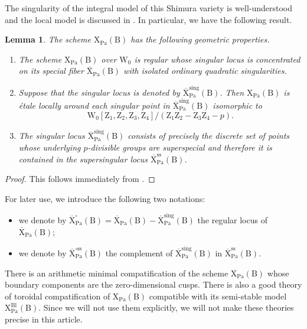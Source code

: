 \documentclass[10pt]{amsart}
\numberwithin{equation}{section}
\newtheorem{lemma}[equation]{Lemma}
\theoremstyle{definition}
\def\Pa{\mathrm{Pa}}
\def\rmB{\mathrm{B}}
\def\rmW{\mathrm{W}}
\def\rmX{\mathrm{X}}
\def\rmZ{\mathrm{Z}}
\begin{document}
The singularity of the integral model of this Shimura variety is well-understood and the local model is discussed in \cite[\S 2.3]{Wanga}. In particular, we have the following result.
\begin{lemma}
The scheme $\rmX_{\Pa}(\rmB)$ has the following geometric properties.
\begin{enumerate}
\item The scheme $\rmX_{\Pa}(\rmB)$ over $\mathrm{W}_{0}$ is regular whose singular locus is concentrated on its special fiber $\overline{\rmX}_{\Pa}(\rmB)$ with isolated ordinary quadratic singularities. 

\item Suppose that the singular locus is denoted by $\overline{\rmX}^{\mathrm{sing}}_{\Pa}(\rmB)$. Then $\rmX_{\Pa}(\rmB)$ is \'etale locally around each singular point in $\overline{\rmX}^{\mathrm{sing}}_{\Pa}(\rmB)$ isomorphic to 
\begin{equation*}
\rmW_{0}[ \rmZ_{1}, \rmZ_{2}, \rmZ_{3}, \rmZ_{4}]/(\rmZ_{1}\rmZ_{2}-\rmZ_{3}\rmZ_{4}-p).
\end{equation*} 
\item The singular locus $\overline{\rmX}^{\mathrm{sing}}_{\Pa}(\rmB)$ consists of precisely the discrete set of points whose underlying $p$-divisible groups are superspecial and therefore it is contained in the supersingular locus $\overline{\rmX}^{\mathrm{ss}}_{\Pa}(\rmB)$.
\end{enumerate}
\end{lemma}
\begin{proof}
This follows immediately from \cite[Theorem 2.2]{Wanga}.
\end{proof}

For later use, we introduce the following two notations:
\begin{itemize}
\item we denote by $\overline{\rmX}^{\square}_{\Pa}(\rmB)=\overline{\rmX}_{\Pa}(\rmB)-\overline{\rmX}^{\mathrm{sing}}_{\Pa}(\rmB)$ the regular locus of $\overline{\rmX}_{\Pa}(\rmB)$;
\item we denote by $\overline{\rmX}^{\square\mathrm{ss}}_{\Pa}(\rmB)$ the complement of $\overline{\rmX}^{\mathrm{sing}}_{\Pa}(\rmB)$ in $\overline{\rmX}^{\mathrm{ss}}_{\Pa}(\rmB)$.
\end{itemize}

There is an arithmetic minimal compatification of the scheme $\rmX_{\Pa}(\rmB)$ whose boundary components are the zero-dimensional cusps. There is also a good theory of toroidal compatification of  $\rmX_{\Pa}(\rmB)$ compatible with its semi-stable model $\rmX^{\mathrm{Bl}}_{\Pa}(\rmB)$. Since we will not use them explicitly, we will not make these theories precise in this article. 
\end{document}
